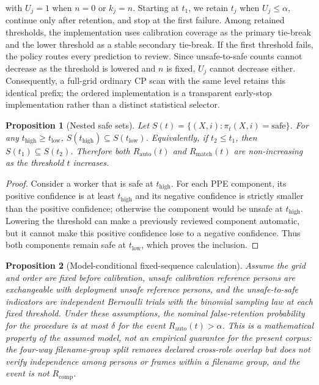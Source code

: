 \documentclass[iicol,pdflatex,sn-mathphys-num]{sn-jnl}
\newtheorem{proposition}{Proposition}
\begin{document}
with $U_j=1$ when $n=0$ or $k_j=n$. Starting at $t_1$, we retain $t_j$ when $U_j\leq\alpha$, continue only after retention, and stop at the first failure. Among retained thresholds, the implementation uses calibration coverage as the primary tie-break and the lower threshold as a stable secondary tie-break. If the first threshold fails, the policy routes every prediction to review. Since unsafe-to-safe counts cannot decrease as the threshold is lowered and $n$ is fixed, $U_j$ cannot decrease either. Consequently, a full-grid ordinary CP scan with the same level retains this identical prefix; the ordered implementation is a transparent early-stop implementation rather than a distinct statistical selector.

\begin{proposition}[Nested safe sets]\label{prop:monotone}
Let $S(t)=\{(X,i):\pi_t(X,i)=\mathrm{safe}\}$. For any $t_{\mathrm{high}}\geq t_{\mathrm{low}}$, $S(t_{\mathrm{high}})\subseteq S(t_{\mathrm{low}})$. Equivalently, if $t_2\leq t_1$, then $S(t_1)\subseteq S(t_2)$. Therefore both $R_{\mathrm{auto}}(t)$ and $R_{\mathrm{match}}(t)$ are non-increasing as the threshold $t$ increases.
\end{proposition}

\begin{proof}
Consider a worker that is safe at $t_{\mathrm{high}}$. For each PPE component, its positive confidence is at least $t_{\mathrm{high}}$ and its negative confidence is strictly smaller than the positive confidence; otherwise the component would be unsafe at $t_{\mathrm{high}}$. Lowering the threshold can make a previously reviewed component automatic, but it cannot make this positive confidence lose to a negative confidence. Thus both components remain safe at $t_{\mathrm{low}}$, which proves the inclusion.
\end{proof}

\begin{proposition}[Model-conditional fixed-sequence calculation]\label{prop:ordered}
Assume the grid and order are fixed before calibration, unsafe calibration reference persons are exchangeable with deployment unsafe reference persons, and the unsafe-to-safe indicators are independent Bernoulli trials with the binomial sampling law at each fixed threshold. Under these assumptions, the nominal false-retention probability for the procedure is at most $\delta$ for the event $R_{\mathrm{auto}}(t)>\alpha$. This is a mathematical property of the assumed model, not an empirical guarantee for the present corpus: the four-way filename-group split removes declared cross-role overlap but does not verify independence among persons or frames within a filename group, and the event is not $R_{\mathrm{comp}}$.
\end{proposition}
\end{document}
